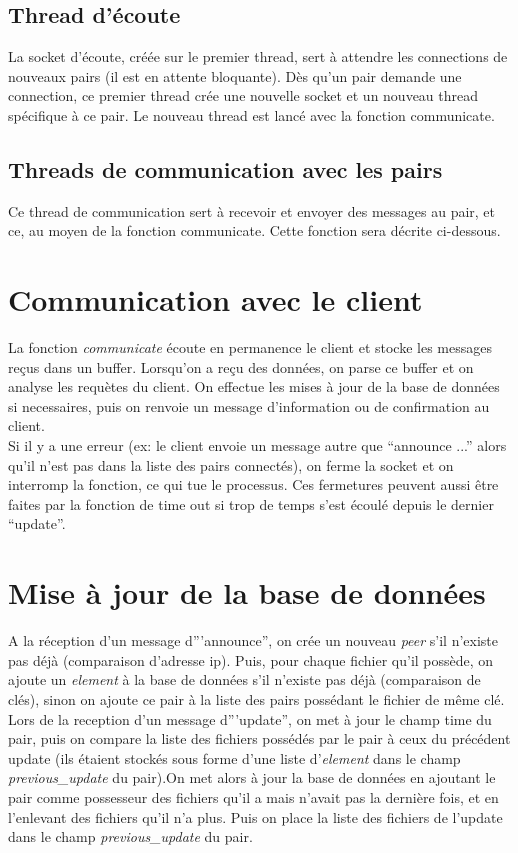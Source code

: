 \subsection{Thread d'écoute}
La socket d'écoute, créée sur le premier thread, sert à attendre les connections de nouveaux pairs (il est en attente bloquante). Dès qu'un pair demande une connection, ce premier thread crée une nouvelle socket et un nouveau thread spécifique à ce pair.
Le nouveau thread est lancé avec la fonction communicate.
\subsection{Threads de communication avec les pairs}
Ce thread de communication sert à recevoir et envoyer des messages au pair, et ce, au moyen de la fonction communicate. Cette fonction sera décrite ci-dessous.


\section{Communication avec le client}

La fonction \textit{communicate} écoute en permanence le client et stocke les messages reçus dans un buffer. Lorsqu'on a reçu des données, on parse ce buffer et on analyse les requètes du client. On effectue les mises à jour de la base de données si necessaires, puis on renvoie un message d'information ou de confirmation au client. \\
Si il y a une erreur (ex: le client envoie un message autre que ``announce ...'' alors qu'il n'est pas dans la liste des pairs connectés), on ferme la socket et on interromp la fonction, ce qui tue le processus. Ces fermetures peuvent aussi être faites par la fonction de time out si trop de temps s'est écoulé depuis le dernier ``update''.

\section{Mise à jour de la base de données}

A la réception d'un message d'''announce'', on crée un nouveau \textit{peer} s'il n'existe pas déjà (comparaison d'adresse ip). Puis, pour chaque fichier qu'il possède, on ajoute un \textit{element} à la base de données s'il n'existe pas déjà (comparaison de clés), sinon on ajoute ce pair à la liste des pairs possédant le fichier de même clé.\\

Lors de la reception d'un message d'''update'', on met à jour le champ time du pair, puis on compare la liste des fichiers possédés par le pair à ceux du précédent update (ils étaient stockés sous forme d'une liste d'\textit{element} dans le champ \textit{previous\_update} du pair).On met alors à jour la base de données en ajoutant le pair comme possesseur des fichiers qu'il a mais n'avait pas la dernière fois, et en l'enlevant des fichiers qu'il n'a plus. Puis on place la liste des fichiers de l'update dans le champ \textit{previous\_update} du pair. 
